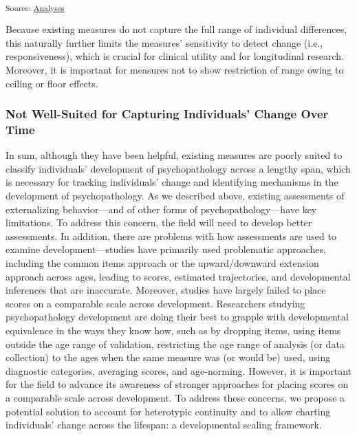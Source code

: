 \documentclass[
  american,
  letterpaper,
  12pt]{article}
\begin{document}
\par\endgroup

\par\endgroup\addvspace{\baselineskip}

\textsubscript{Source:
\href{https://DevPsyLab.github.io/studying-psychopathology-development-lifespan/notebooks/analyses-preview.html\#cell-tbl-externalizingfacets}{Analyses}}

Because existing measures do not capture the full range of individual
differences, this naturally further limits the measures' sensitivity to
detect change (i.e., responsiveness), which is crucial for clinical
utility and for longitudinal research. Moreover, it is important for
measures not to show restriction of range owing to ceiling or floor
effects.

\subsubsection{Not Well-Suited for Capturing Individuals' Change Over
Time}\label{not-well-suited-for-capturing-individuals-change-over-time}

In sum, although they have been helpful, existing measures are poorly
suited to classify individuals' development of psychopathology across a
lengthy span, which is necessary for tracking individuals' change and
identifying mechanisms in the development of psychopathology. As we
described above, existing assessments of externalizing behavior---and of
other forms of psychopathology---have key limitations. To address this
concern, the field will need to develop better assessments. In addition,
there are problems with how assessments are used to examine
development---studies have primarily used problematic approaches,
including the common items approach or the upward/downward extension
approach across ages, leading to scores, estimated trajectories, and
developmental inferences that are inaccurate. Moreover, studies have
largely failed to place scores on a comparable scale across development.
Researchers studying psychopathology development are doing their best to
grapple with developmental equivalence in the ways they know how, such
as by dropping items, using items outside the age range of validation,
restricting the age range of analysis (or data collection) to the ages
when the same measure was (or would be) used, using diagnostic
categories, averaging scores, and age-norming. However, it is important
for the field to advance its awareness of stronger approaches for
placing scores on a comparable scale across development. To address
these concerns, we propose a potential solution to account for
heterotypic continuity and to allow charting individuals' change across
the lifespan: a developmental scaling framework.
\end{document}
